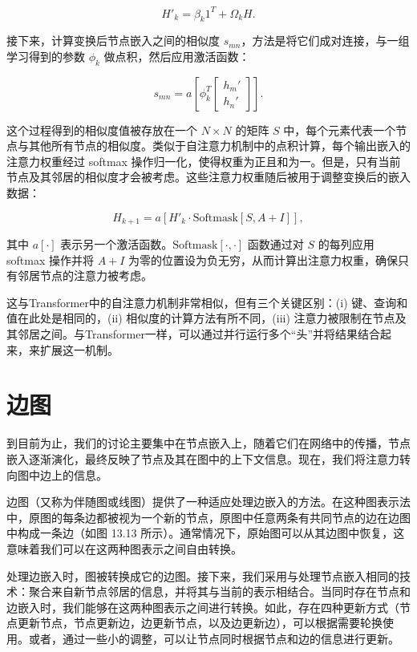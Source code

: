 \documentclass[lang=cn,newtx,10pt,scheme=chinese]{elegantbook}
\begin{document}
\begin{equation}
H'_k = \beta_k 1^T + \Omega_k H. 
\end{equation}

接下来，计算变换后节点嵌入之间的相似度 \(s_{mn}\)，方法是将它们成对连接，与一组学习得到的参数 \(\phi_k\) 做点积，然后应用激活函数：

\begin{equation}
s_{mn} = a \left[ \phi_k^T \left[ \begin{array}{c}
h_m' \\
h_n'
\end{array} \right] \right]. 
\end{equation}

这个过程得到的相似度值被存放在一个 \(N \times N\) 的矩阵 \(S\) 中，每个元素代表一个节点与其他所有节点的相似度。类似于自注意力机制中的点积计算，每个输出嵌入的注意力权重经过 softmax 操作归一化，使得权重为正且和为一。但是，只有当前节点及其邻居的相似度才会被考虑。这些注意力权重随后被用于调整变换后的嵌入数据：

\begin{equation}
H_{k+1} = a \left[ H'_k \cdot \text{Softmask}[S, A + I] \right], 
\end{equation}

其中 \(a[\cdot]\) 表示另一个激活函数。\(\text{Softmask}[\cdot,\cdot]\) 函数通过对 \(S\) 的每列应用 softmax 操作并将 \(A + I\) 为零的位置设为负无穷，从而计算出注意力权重，确保只有邻居节点的注意力被考虑。

这与Transformer中的自注意力机制非常相似，但有三个关键区别：(i) 键、查询和值在此处是相同的，(ii) 相似度的计算方法有所不同，(iii) 注意力被限制在节点及其邻居之间。与Transformer一样，可以通过并行运行多个“头”并将结果结合起来，来扩展这一机制。

\section{边图}
到目前为止，我们的讨论主要集中在节点嵌入上，随着它们在网络中的传播，节点嵌入逐渐演化，最终反映了节点及其在图中的上下文信息。现在，我们将注意力转向图中边上的信息。

边图（又称为伴随图或线图）提供了一种适应处理边嵌入的方法。在这种图表示法中，原图的每条边都被视为一个新的节点，原图中任意两条有共同节点的边在边图中构成一条边（如图 13.13 所示）。通常情况下，原始图可以从其边图中恢复，这意味着我们可以在这两种图表示之间自由转换。

处理边嵌入时，图被转换成它的边图。接下来，我们采用与处理节点嵌入相同的技术：聚合来自新节点邻居的信息，并将其与当前的表示相结合。当同时存在节点和边嵌入时，我们能够在这两种图表示之间进行转换。如此，存在四种更新方式（节点更新节点，节点更新边，边更新节点，以及边更新边），可以根据需要轮换使用。或者，通过一些小的调整，可以让节点同时根据节点和边的信息进行更新。
\end{document}
